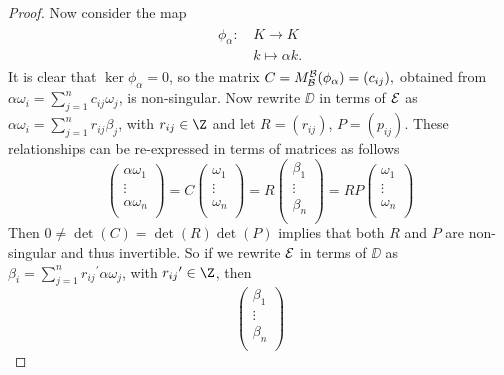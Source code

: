 \documentclass[10pt]{amsart}
\begin{document}
\begin{thm}
\begin{proof}
    Now consider the map 
    \begin{align*}
      \begin{split}
      \phi_{\alpha}:\,& K \longrightarrow K\\
      &k \mapsto \alpha k.
    \end{split}
  \end{align*}
  It is clear that $\ker{\phi_{\alpha}} = 0$, so the matrix $C = M_{\BB}^{\BB}(\phi_{\alpha}) = (c_{ij}),$ obtained from  $\alpha\omega_i = \sum_{j=1}^n c_{ij}\omega_j$, is non-singular.
  Now rewrite $\DD$ in terms of $\EE$ as $\alpha\omega_i = \sum_{j=1}^n r_{ij}\beta_j$, with $r_{ij} \in \Z$ and let $R = (r_{ij})$, $P = (p_{ij})$.
  These relationships can be re-expressed in terms of matrices as follows
  $$
  \begin{pmatrix}
    \alpha\omega_1\\
    \vdots\\
    \alpha\omega_n\\
  \end{pmatrix}
  = 
  C\begin{pmatrix}
    \omega_1\\
    \vdots\\
    \omega_n\\
  \end{pmatrix}
  = 
  R
  \begin{pmatrix}
    \beta_1\\
    \vdots\\
    \beta_n\\
  \end{pmatrix}
  = RP
  \begin{pmatrix}
    \omega_1\\
    \vdots\\
    \omega_n\\
  \end{pmatrix}
  $$
  Then $0 \not = \det(C) = \det(R)\det(P)$ implies that both $R$ and $P$ are non-singular and thus invertible.
  So if we rewrite $\EE$ in terms of $\DD$ as $\beta_i = \sum_{j=1}^n {r_{ij}}^{\prime}\alpha\omega_j$, with ${r_{ij}}^{\prime} \in \Z$, then 
  $$
  \begin{pmatrix}
    \beta_1\\
    \vdots\\
    \beta_n\\

\end{pmatrix}$$
\end{proof}
\end{thm}
\end{document}

